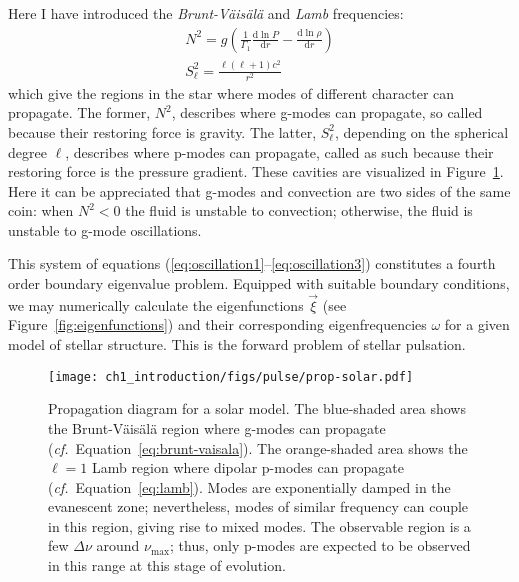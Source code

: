Here I have introduced the \emph{Brunt-V\"ais\"al\"a} and \emph{Lamb}  frequencies: 
\begin{gather} \label{eq:brunt-vaisala}
    N^2
    =
    g
    \left(
        \frac{1}{\Gamma_1}
        \frac{\text{d} \ln P}{\text{d}r}
        -
        \frac{\text{d} \ln \rho}{\text{d}r}
    \right) 
    \\ \label{eq:lamb}
    S^2_\ell
    =
    \frac{\ell(\ell+1)c^2}{r^2}
\end{gather}
which give the regions in the star where modes of different character can propagate. 
The former, $N^2$, describes where g-modes can propagate, so called because their restoring force is gravity. 
The latter, $S_\ell^2$, depending on the spherical degree $\ell$, describes where p-modes can propagate, called as such because their restoring force is the pressure gradient. 
These cavities are visualized in Figure~\ref{fig:propagation}. 
Here it can be appreciated that g-modes and convection are two sides of the same coin: when ${N^2<0}$ the fluid is unstable to convection; otherwise, the fluid is unstable to g-mode oscillations. 

This system of equations (\ref{eq:oscillation1}--\ref{eq:oscillation3}) constitutes a fourth order boundary eigenvalue problem. 
Equipped with suitable boundary conditions, we may numerically calculate the eigenfunctions $\vec\xi$ (see Figure~\ref{fig:eigenfunctions}) and their corresponding eigenfrequencies $\omega$ for a given model of stellar structure. 
This is the forward problem of stellar pulsation. 


\begin{figure}
    \centering
    \texttt{[image: ch1\_introduction/figs/pulse/prop-solar.pdf]}
    \caption[Propagation diagram]{Propagation diagram for a solar model. 
    The blue-shaded area shows the Brunt-V\"ais\"al\"a region where g-modes can propagate (\emph{cf.}~Equation~\ref{eq:brunt-vaisala}). 
    The orange-shaded area shows the ${\ell=1}$ Lamb region where dipolar p-modes can propagate (\emph{cf.}~Equation~\ref{eq:lamb}). 
    Modes are exponentially damped in the evanescent zone; nevertheless, modes of similar frequency can couple in this region, giving rise to mixed modes. 
    The observable region is a few ${\Delta\nu}$ around $\nu_{\max}$; thus, only p-modes are expected to be observed in this range at this stage of evolution. 
    \label{fig:propagation}}
\end{figure}




